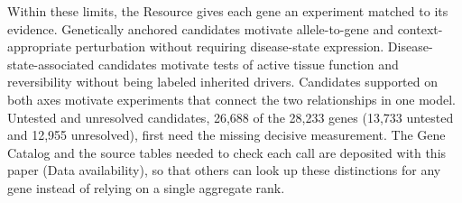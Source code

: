 Within these limits, the Resource gives each gene an experiment matched to its evidence. Genetically anchored candidates motivate allele-to-gene and
context-appropriate perturbation without requiring disease-state expression.
Disease-state-associated candidates motivate tests of active tissue function and
reversibility without being labeled inherited drivers. Candidates supported on
both axes motivate experiments that connect the two relationships in one model.
Untested and unresolved candidates, 26,688 of the 28,233 genes (13,733 untested and 12,955 unresolved), first need the
missing decisive measurement. The Gene Catalog and the source tables needed to check each call
are deposited with this paper (Data availability), so that others can look up
these distinctions for any gene instead of relying on a single aggregate rank.
